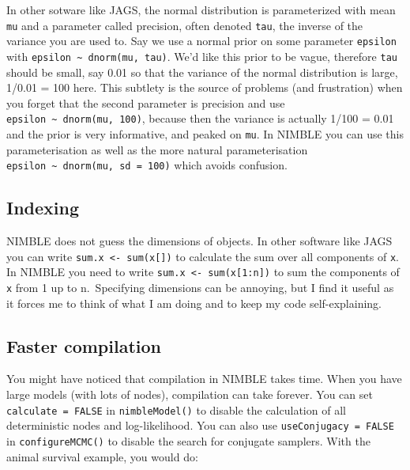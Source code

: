 \documentclass[
  12pt,
]{krantz}
\begin{document}
In other sotware like JAGS, the normal distribution is parameterized with mean \texttt{mu} and a parameter called precision, often denoted \texttt{tau}, the inverse of the variance you are used to. Say we use a normal prior on some parameter \texttt{epsilon} with \texttt{epsilon\ \textasciitilde{}\ dnorm(mu,\ tau)}. We'd like this prior to be vague, therefore \texttt{tau} should be small, say 0.01 so that the variance of the normal distribution is large, 1/0.01 = 100 here. This subtlety is the source of problems (and frustration) when you forget that the second parameter is precision and use \texttt{epsilon\ \textasciitilde{}\ dnorm(mu,\ 100)}, because then the variance is actually 1/100 = 0.01 and the prior is very informative, and peaked on \texttt{mu}. In NIMBLE you can use this parameterisation as well as the more natural parameterisation \texttt{epsilon\ \textasciitilde{}\ dnorm(mu,\ sd\ =\ 100)} which avoids confusion.

\hypertarget{indexing}{%
\subsection{Indexing}\label{indexing}}

NIMBLE does not guess the dimensions of objects. In other software like JAGS you can write \texttt{sum.x\ \textless{}-\ sum(x{[}{]})} to calculate the sum over all components of \texttt{x}. In NIMBLE you need to write \texttt{sum.x\ \textless{}-\ sum(x{[}1:n{]})} to sum the components of \texttt{x} from 1 up to n.~Specifying dimensions can be annoying, but I find it useful as it forces me to think of what I am doing and to keep my code self-explaining.

\hypertarget{faster-compilation}{%
\subsection{Faster compilation}\label{faster-compilation}}

You might have noticed that compilation in NIMBLE takes time. When you have large models (with lots of nodes), compilation can take forever. You can set \texttt{calculate\ =\ FALSE} in \texttt{nimbleModel()} to disable the calculation of all deterministic nodes and log-likelihood. You can also use \texttt{useConjugacy\ =\ FALSE} in \texttt{configureMCMC()} to disable the search for conjugate samplers. With the animal survival example, you would do:
\end{document}
